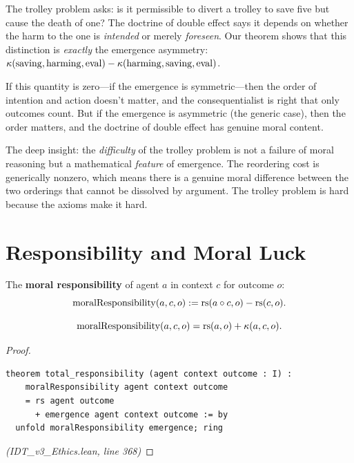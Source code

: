 \begin{interpretation}
The trolley problem asks: is it permissible to divert a trolley to save five
but cause the death of one? The doctrine of double effect says it depends on
whether the harm to the one is \emph{intended} or merely \emph{foreseen}.
Our theorem shows that this distinction is \emph{exactly} the emergence
asymmetry: $\kappa(\mathrm{saving}, \mathrm{harming}, \mathrm{eval}) -
\kappa(\mathrm{harming}, \mathrm{saving}, \mathrm{eval})$.

If this quantity is zero---if the emergence is symmetric---then the order of
intention and action doesn't matter, and the consequentialist is right that
only outcomes count. But if the emergence is asymmetric (the generic case),
then the order matters, and the doctrine of double effect has genuine moral
content.

The deep insight: the \emph{difficulty} of the trolley problem is not a
failure of moral reasoning but a mathematical \emph{feature} of emergence.
The reordering cost is generically nonzero, which means there is a genuine
moral difference between the two orderings that cannot be dissolved by
argument. The trolley problem is hard because the axioms make it hard.
\end{interpretation}

\section{Responsibility and Moral Luck}

\begin{definition}
\label{def:responsibility}
The \textbf{moral responsibility} of agent $a$ in context $c$ for outcome $o$:
\[
  \mathrm{moralResponsibility}(a, c, o) := \mathrm{rs}(a \circ c, o) - \mathrm{rs}(c, o).
\]
\end{definition}

\begin{theorem}
\label{thm:total-responsibility}
\[
  \mathrm{moralResponsibility}(a, c, o) = \mathrm{rs}(a, o) + \kappa(a, c, o).
\]
\end{theorem}

\begin{proof}
\begin{lstlisting}
theorem total_responsibility (agent context outcome : I) :
    moralResponsibility agent context outcome
    = rs agent outcome
      + emergence agent context outcome := by
  unfold moralResponsibility emergence; ring
\end{lstlisting}
\textit{(IDT\_v3\_Ethics.lean, line 368)}
\end{proof}

